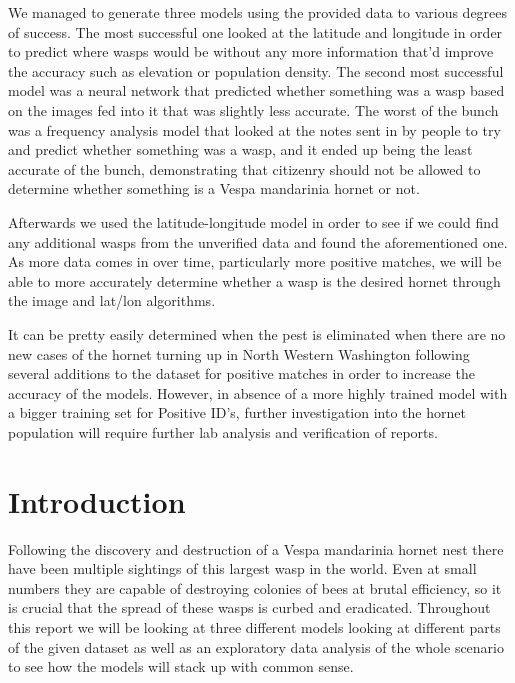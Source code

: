 \documentclass[letterpaper]{article}
\begin{document}
We managed to generate three models using the provided data to various degrees of success. The most successful one looked at the latitude and longitude in order to predict where wasps would be without any more information that'd improve the accuracy such as elevation or population density. The second most successful model was a neural network that predicted whether something was a wasp based on the images fed into it that was slightly less accurate. The worst of the bunch was a frequency analysis model that looked at the notes sent in by people to try and predict whether something was a wasp, and it ended up being the least accurate of the bunch, demonstrating that citizenry should not be allowed to determine whether something is a Vespa mandarinia hornet or not.

Afterwards we used the latitude-longitude model in order to see if we could find any additional wasps from the unverified data and found the aforementioned one. As more data comes in over time, particularly more positive matches, we will be able to more accurately determine whether a wasp is the desired hornet through the image and lat/lon algorithms. 

It can be pretty easily determined when the pest is eliminated when there are no new cases of the hornet turning up in North Western Washington following several additions to the dataset for positive matches in order to increase the accuracy of the models. However, in absence of a more highly trained model with a bigger training set for Positive ID's, further investigation into the hornet population will require further lab analysis and verification of reports. 

\printbibliography

\pagebreak
\tableofcontents
\pagebreak

\section{Introduction}

Following the discovery and destruction of a Vespa mandarinia hornet nest there have been multiple sightings of this largest wasp in the world. Even at small numbers they are capable of destroying colonies of bees at brutal efficiency, so it is crucial that the spread of these wasps is curbed and eradicated. Throughout this report we will be looking at three different models looking at different parts of the given dataset as well as an exploratory data analysis of the whole scenario to see how the models will stack up with common sense. 
\end{document}

